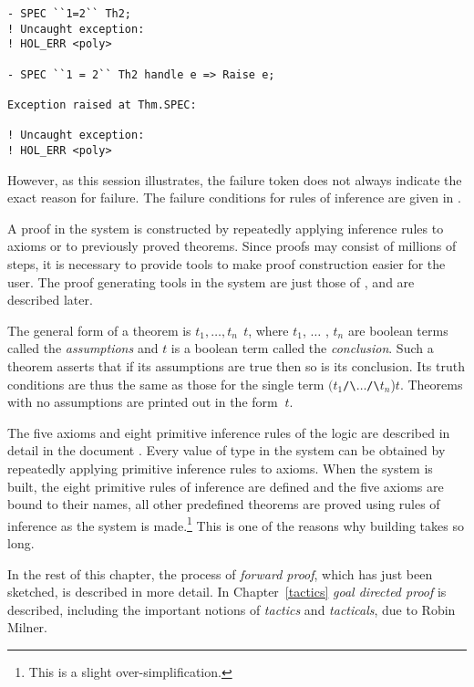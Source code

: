 \begin{session}
\begin{verbatim}
- SPEC ``1=2`` Th2;
! Uncaught exception:
! HOL_ERR <poly>

- SPEC ``1 = 2`` Th2 handle e => Raise e;

Exception raised at Thm.SPEC:

! Uncaught exception:
! HOL_ERR <poly>
\end{verbatim}
\end{session}
However, as this session illustrates, the failure token does not
always indicate the exact reason for failure. The failure conditions
for rules of inference are given in \REFERENCE.

A proof in the \HOL{} system is constructed by repeatedly applying
inference rules to axioms or to previously proved theorems.  Since
proofs may consist of millions of steps, it is necessary to provide
tools to make proof construction easier for the user.  The proof
generating tools in the \HOL{} system are just those of \LCF, and are
described later.

The general form of a theorem is $t_1,\ldots,t_n\ $\ml{|-}$\ t$, where
$t_1$, $\ldots$ , $t_n$ are boolean terms called the {\it assumptions}
and $t$ is a boolean term called the {\it conclusion\/}.  Such a
theorem asserts that if its assumptions are true then so is its
conclusion.  Its truth conditions are thus the same as those for the
single term
$(t_1${\small\verb|/\|}$\ldots${\small\verb|/\|}$t_n$)\ml{==>}$t$.
Theorems with no assumptions are printed out in the form \ml{|-}$\ t$.

The five axioms and eight primitive inference rules of the \HOL{} logic
are described in detail in the document \DESCRIPTION.  Every value of
type  in the \HOL{} system can be obtained by repeatedly
applying primitive inference rules to axioms.  When the \HOL{} system
is built, the eight primitive rules of inference are defined and the
five axioms are bound to their \ML{} names, all other predefined
theorems are proved using rules of inference as the system is
made.\footnote{This is a slight over-simplification.} This is one of
the reasons why building  takes so long.

In the rest of this chapter, the process of {\it forward proof\/},
which has just been sketched, is described in more detail.  In
Chapter~\ref{tactics} {\it goal directed proof\/} is described,
including the important notions of {\it tactics\/} and {\it
  tacticals\/}, due to Robin Milner.

